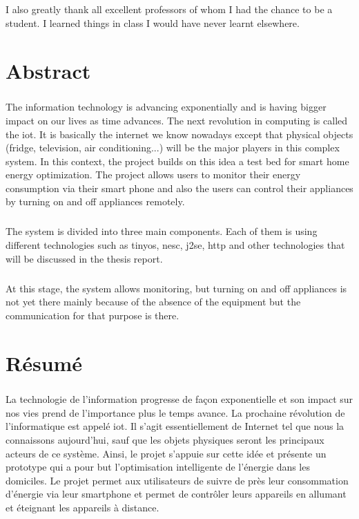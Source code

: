 \documentclass[oneside,12pt,a4paper,final]{book}
\begin{document}
\paragraph{}
I also greatly thank all excellent professors of whom I had the chance to be a student. I learned things in class  I would have never learnt elsewhere.


\chapter{Abstract}
\paragraph{}
The information technology is advancing exponentially and is having bigger impact on our lives as time advances. The next revolution in computing is called the \gls{iot}. It is basically the internet we know nowadays except that physical objects (fridge, television, air conditioning...) will be the major players in this complex system. In this context, the project builds on this idea a test bed for smart home energy optimization. The project allows users to monitor their energy consumption via their smart phone and also the users can control their appliances by turning on and off appliances remotely.
\paragraph{}
The system is divided into three main components. Each of them is using different technologies such as \gls{tinyos}, \gls{nesc}, \gls{j2se}, \gls{http} and other technologies that will be discussed in the thesis report.
\paragraph{}
At this stage, the system allows monitoring, but turning on and off appliances is not yet there mainly because of the absence of the equipment but the communication for that purpose is there.

\chapter{Résumé}
\paragraph{}
La technologie de l'information progresse de façon exponentielle et son impact sur nos vies prend de l'importance plus le temps avance. La prochaine révolution de l'informatique est appelé  \gls{iot}. Il s'agit essentiellement de Internet tel que nous la connaissons aujourd'hui, sauf que les objets physiques  seront les principaux acteurs de ce système. Ainsi, le projet s'appuie sur cette idée et présente un prototype qui a pour but l'optimisation intelligente de l'énergie dans les domiciles. Le projet permet aux utilisateurs de suivre de près leur consommation d'énergie via leur smartphone et permet de contrôler leurs appareils en allumant et éteignant les appareils à distance.
\end{document}
